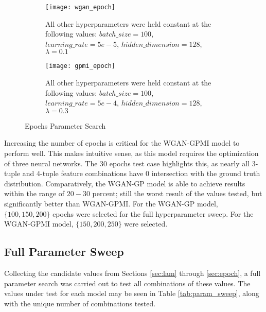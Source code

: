 \begin{figure}[!htbp]
	\centering
	\begin{subfigure}{.7\textwidth}
		\texttt{[image: wgan\_epoch]}
	\end{subfigure}%
	\begin{subfigure}{.3\textwidth}
		\caption{
			All other hyperparameters were held constant at the following values: $batch\_size = 100$, $learning\_rate=5e-5$, $hidden\_dimension=128$, $\lambda=0.1$
		}
		\label{fig:wgan_epoch}
	\end{subfigure}%

	\begin{subfigure}{.7\textwidth}
		\texttt{[image: gpmi\_epoch]}
	\end{subfigure}%
	\begin{subfigure}{.3\textwidth}
		\caption{
			All other hyperparameters were held constant at the following values: $batch\_size=100$, $learning\_rate=5e-4$, $hidden\_dimension=128$, $\lambda=0.3$
		}
		\label{fig:gpmi_epoch}
	\end{subfigure}%
	\caption{Epochs Parameter Search}
\end{figure}

Increasing the number of epochs is critical for the WGAN-GPMI model to perform well. This makes intuitive sense, as this model requires the optimization of three neural networks. The $30$ epochs test case highlights this, as nearly all 3-tuple and 4-tuple feature combinations have 0 intersection with the ground truth distribution. Comparatively, the WGAN-GP model is able to achieve results within the range of $20-30$ percent; still the worst result of the values tested, but significantly better than WGAN-GPMI. For the WGAN-GP model, $\{100,150,200\}$ epochs were selected for the full hyperparameter sweep. For the WGAN-GPMI model, $\{150, 200, 250\}$ were selected.

\subsection{Full Parameter Sweep}

Collecting the candidate values from Sections \ref{sec:lam} through \ref{sec:epoch}, a full parameter search was carried out to test all combinations of these values. The values under test for each model may be seen in Table \ref{tab:param_sweep}, along with the unique number of combinations tested.

